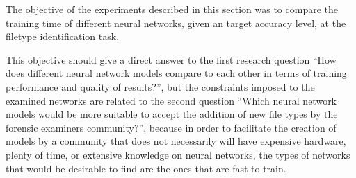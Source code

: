 The objective of the experiments described in this section 
was to compare the training time of different neural networks, given an target accuracy level, at the filetype identification task.

This objective should give a direct answer to the first research question ``How does different neural network models compare to each other in terms of training performance and quality of results?'', but the constraints imposed to the examined networks are related to the second question ``Which neural network models would be more suitable to accept the addition of new file types by the forensic examiners community?'', because in order to facilitate the creation of models by a community that does not necessarily will have expensive hardware, plenty of time, or extensive knowledge on neural networks, the types of networks that would be desirable to find are the ones that are fast to train.